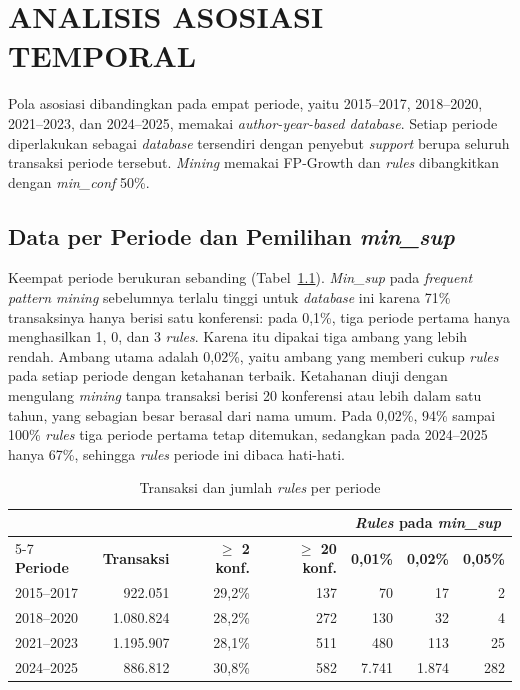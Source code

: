 \chapter{ANALISIS ASOSIASI TEMPORAL}
\label{chap:temporal}\label{sec:hasil-e}

Pola asosiasi dibandingkan pada empat periode, yaitu 2015--2017, 2018--2020, 2021--2023, dan 2024--2025, memakai \textit{author-year-based database}. Setiap periode diperlakukan sebagai \textit{database} tersendiri dengan penyebut \textit{support} berupa seluruh transaksi periode tersebut. \textit{Mining} memakai FP-Growth dan \textit{rules} dibangkitkan dengan \textit{min\_conf} 50\%.

\section{Data per Periode dan Pemilihan \textit{min\_sup}}
\label{sec:hasil-e-data}
Keempat periode berukuran sebanding (Tabel~\ref{tab:e-periode}). \textit{Min\_sup} pada \textit{frequent pattern mining} sebelumnya terlalu tinggi untuk \textit{database} ini karena 71\% transaksinya hanya berisi satu konferensi: pada 0,1\%, tiga periode pertama hanya menghasilkan 1, 0, dan 3 \textit{rules}. Karena itu dipakai tiga ambang yang lebih rendah. Ambang utama adalah 0,02\%, yaitu ambang yang memberi cukup \textit{rules} pada setiap periode dengan ketahanan terbaik. Ketahanan diuji dengan mengulang \textit{mining} tanpa transaksi berisi 20 konferensi atau lebih dalam satu tahun, yang sebagian besar berasal dari nama umum. Pada 0,02\%, 94\% sampai 100\% \textit{rules} tiga periode pertama tetap ditemukan, sedangkan pada 2024--2025 hanya 67\%, sehingga \textit{rules} periode ini dibaca hati-hati.

\begin{table}[!htb]
\caption{Transaksi dan jumlah \textit{rules} per periode}
\label{tab:e-periode}
\small
\begin{tabular*}{\textwidth}{@{\extracolsep{\fill}}@{}lrrrrrr@{}}
\toprule
 & & & & \multicolumn{3}{c}{\textbf{\textit{Rules} pada \textit{min\_sup}}} \\
\cmidrule(lr){5-7}
\textbf{Periode} & \textbf{Transaksi} & \textbf{$\geq$ 2 konf.} & \textbf{$\geq$ 20 konf.} & \textbf{0,01\%} & \textbf{0,02\%} & \textbf{0,05\%} \\
\midrule
2015--2017 & 922.051 & 29,2\% & 137 & 70 & 17 & 2 \\
2018--2020 & 1.080.824 & 28,2\% & 272 & 130 & 32 & 4 \\
2021--2023 & 1.195.907 & 28,1\% & 511 & 480 & 113 & 25 \\
2024--2025 & 886.812 & 30,8\% & 582 & 7.741 & 1.874 & 282 \\
\bottomrule
\end{tabular*}
\end{table}

